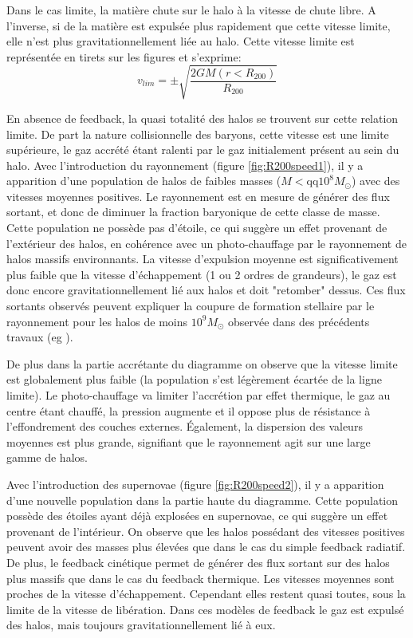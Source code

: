 Dans le cas limite, la matière chute sur le halo à la vitesse de chute libre.
A l'inverse, si de la matière est expulsée plus rapidement que cette vitesse limite, elle n'est plus gravitationnellement liée au halo.
Cette vitesse limite est représentée en tirets sur les figures et s'exprime:
\begin{equation}
v_{lim} = \pm \sqrt{\frac{2 GM (r<R_{200})} {R_{200}} } 
\end{equation}

En absence de feedback, la quasi totalité des halos se trouvent sur cette relation limite.
De part la nature collisionnelle des baryons, cette vitesse est une limite supérieure, le gaz accrété étant ralenti par le gaz initialement présent au sein du halo.
Avec l'introduction du rayonnement (figure \ref{fig:R200speed1}), il y a apparition d'une population de halos de faibles masses ($M< \mathrm{qq} 10^8 M_\odot$) avec des vitesses moyennes positives.
Le rayonnement est en mesure de générer des flux sortant, et donc de diminuer la fraction baryonique de cette classe de masse. 
Cette population ne possède pas d'étoile, ce qui suggère un effet provenant de l'extérieur des halos, en cohérence avec un photo-chauffage par le rayonnement de halos massifs environnants.
La vitesse d'expulsion moyenne est significativement plus faible que la vitesse d'échappement (1 ou 2 ordres de grandeurs), le gaz est donc encore gravitationnellement lié aux halos et doit "retomber" dessus.
Ces flux sortants observés peuvent expliquer la coupure de formation stellaire par le rayonnement pour les halos de moins $10^9 M_\odot$ observée dans des précédents travaux (eg \cite{ocvirk_cosmic_2015}).

De plus dans la partie accrétante du diagramme on observe que la vitesse limite est globalement plus faible (la population s'est légèrement écartée de la ligne limite).
Le photo-chauffage va limiter l'accrétion par effet thermique, le gaz au centre étant chauffé, la pression augmente et il oppose plus de résistance à l'effondrement des couches externes.
Également, la dispersion des valeurs moyennes est plus grande, signifiant que le rayonnement agit sur une large gamme de halos.

Avec l'introduction des supernovae (figure \ref{fig:R200speed2}), il y a apparition d'une nouvelle population dans la partie haute du diagramme.
Cette population possède des étoiles ayant déjà explosées en supernovae, ce qui suggère un effet provenant de l'intérieur.
On observe que les halos possédant des vitesses positives peuvent avoir des masses plus élevées que dans le cas du simple feedback radiatif.
De plus, le feedback cinétique permet de générer des flux sortant sur des halos plus massifs que dans le cas du feedback thermique.
Les vitesses moyennes sont proches de la vitesse d'échappement.
Cependant elles restent quasi toutes, sous la limite de la vitesse de libération.
Dans ces modèles de feedback le gaz est expulsé des halos, mais toujours gravitationnellement lié à eux.


